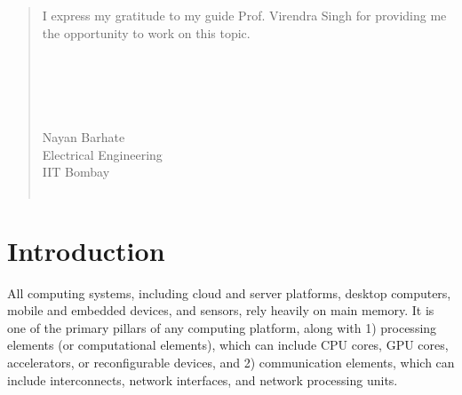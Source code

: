 \documentclass[a4paper,12pt, final]{report}
\begin{document}
\renewcommand{\abstractname}{Acknowledgement}
\begin{abstract}
I express my gratitude to my guide Prof. Virendra Singh for providing me the opportunity to work on this topic. 
\\\\
\\\\
\\\\
Nayan Barhate\\
Electrical Engineering\\
IIT Bombay\\\

\end{abstract}


\clearpage 
\renewcommand{\abstractname}{Abstract} 

\tableofcontents
  \listoffigures

\chapter{Introduction}
All computing systems, including cloud and server platforms, desktop computers, mobile and embedded devices, and sensors, rely heavily on main memory. It is one of the primary pillars of any computing platform, along with 1) processing elements (or computational elements), which can include CPU cores, GPU cores, accelerators, or reconfigurable devices, and 2) communication elements, which can include interconnects, network interfaces, and network processing units.
\end{document}
